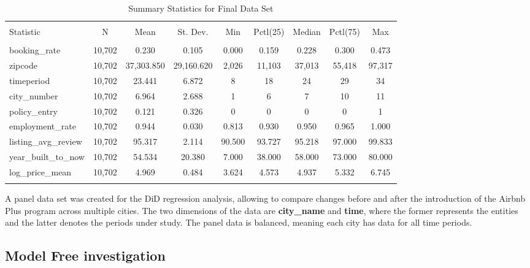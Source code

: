 \documentclass[
  12pt,
]{article}
\begin{document}
\begin{table}[!htbp] \centering 
  \caption{Summary Statistics for Final Data Set} 
  \label{} 
\small 
\begin{tabular}{@{\extracolsep{5pt}}lcccccccc} 
\\[-1.8ex]\hline 
\hline \\[-1.8ex] 
Statistic & \multicolumn{1}{c}{N} & \multicolumn{1}{c}{Mean} & \multicolumn{1}{c}{St. Dev.} & \multicolumn{1}{c}{Min} & \multicolumn{1}{c}{Pctl(25)} & \multicolumn{1}{c}{Median} & \multicolumn{1}{c}{Pctl(75)} & \multicolumn{1}{c}{Max} \\ 
\hline \\[-1.8ex] 
booking\_rate & 10,702 & 0.230 & 0.105 & 0.000 & 0.159 & 0.228 & 0.300 & 0.473 \\ 
zipcode & 10,702 & 37,303.850 & 29,160.620 & 2,026 & 11,103 & 37,013 & 55,418 & 97,317 \\ 
timeperiod & 10,702 & 23.441 & 6.872 & 8 & 18 & 24 & 29 & 34 \\ 
city\_number & 10,702 & 6.964 & 2.688 & 1 & 6 & 7 & 10 & 11 \\ 
policy\_entry & 10,702 & 0.121 & 0.326 & 0 & 0 & 0 & 0 & 1 \\ 
employment\_rate & 10,702 & 0.944 & 0.030 & 0.813 & 0.930 & 0.950 & 0.965 & 1.000 \\ 
listing\_avg\_review & 10,702 & 95.317 & 2.114 & 90.500 & 93.727 & 95.218 & 97.000 & 99.833 \\ 
year\_built\_to\_now & 10,702 & 54.534 & 20.380 & 7.000 & 38.000 & 58.000 & 73.000 & 80.000 \\ 
log\_price\_mean & 10,702 & 4.969 & 0.484 & 3.624 & 4.573 & 4.937 & 5.332 & 6.745 \\ 
\hline \\[-1.8ex] 
\end{tabular} 
\end{table} 
\newpage

A panel data set was created for the DiD regression analysis, allowing
to compare changes before and after the introduction of the Airbnb Plus
program across multiple cities. The two dimensions of the data are
\textbf{city\_name} and \textbf{time}, where the former represents the
entities and the latter denotes the periods under study. The panel data
is balanced, meaning each city has data for all time periods.

\subsection{Model Free investigation}\label{model-free-investigation}
\end{document}
